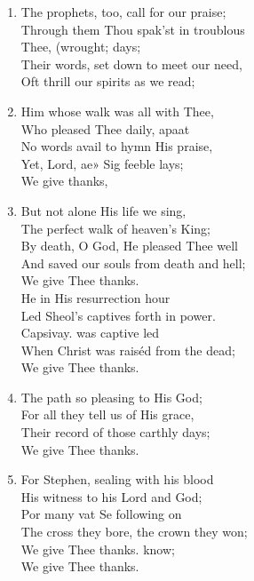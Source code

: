 \documentclass[11pt,a4paper]{article}
\begin{document}
\begin{enumerate}
    \item The prophets, too, call for our praise; \\
        Through them Thou spak'st in troublous \\
        Thee, (wrought; days; \\
        Their words, set down to meet our need, \\
        Oft thrill our spirits as we read;

    \item Him whose walk was all with Thee, \\
        Who pleased Thee daily, apaat \\
        No words avail to hymn His praise, \\
        Yet, Lord, ae» Sig feeble lays; \\
        We give thanks,

    \item But not alone His life we sing, \\
        The perfect walk of heaven's King; \\
        By death, O God, He pleased Thee well \\
        And saved our souls from death and hell; \\
        We give Thee thanks. \\
        He in His resurrection hour \\
        Led Sheol's captives forth in power. \\
        Capsivay. was captive led \\
        When Christ was raiséd from the dead; \\
        We give Thee thanks.

    \item The path so pleasing to His God; \\
        For all they tell us of His grace, \\
        Their record of those carthly days; \\
        We give Thee thanks.

    \item For Stephen, sealing with his blood \\
        His witness to his Lord and God; \\
        Por many vat Se following on \\
        The cross they bore, the crown they won; \\
        We give Thee thanks. know; \\
        We give Thee thanks.


\end{enumerate}
\end{document}
